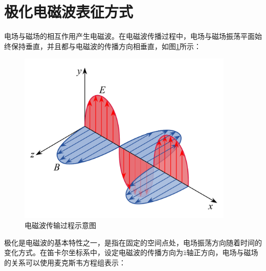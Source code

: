 \documentclass[promaster]{thesis-uestc}
\begin{document}
\section{极化电磁波表征方式}
电场与磁场的相互作用产生电磁波。在电磁波传播过程中，电场与磁场振荡平面始终保持垂直，并且都与电磁波的传播方向相垂直，如图\ref{电磁波传输过程示意图}所示：

\begin{figure}[h]
    \includegraphics[width=10.3cm]{pic/chapter2/电磁波传输过程.pdf}
    \caption{电磁波传输过程示意图}
    \label{电磁波传输过程示意图}
\end{figure}

极化是电磁波的基本特性之一，是指在固定的空间点处，电场振荡方向随着时间的变化方式。在笛卡尔坐标系中，设定电磁波的传播方向为$\hat{z}$轴正方向，电场与磁场的关系可以使用麦克斯韦方程组表示：
\end{document}
